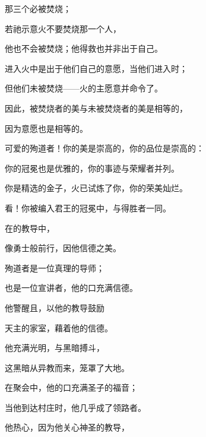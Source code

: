 那三个必被焚烧；\par

若祂示意火不要焚烧那一个人，\par

他也不会被焚烧；他得救也并非出于自己。\par

进入火中是出于他们自己的意愿，当他们进入时；\par

但他们未被焚烧——火的主愿意并命令了。\par

因此，被焚烧者的美与未被焚烧者的美是相等的，\par

因为意愿也是相等的。\par

可爱的殉道者！你的美是崇高的，你的品位是崇高的：\par

你的冠冕也是优雅的，你的事迹与荣耀者并列。\par

你是精选的金子，火已试炼了你，你的荣美灿烂。\par

看！你被编入君王的冠冕中，与得胜者一同。\par

在的教导中，\par

像勇士般前行，因他信德之美。\par

殉道者是一位真理的导师；\par

也是一位宣讲者，他的口充满信德。\par

他警醒且，以他的教导鼓励\par

天主的家室，藉着他的信德。\par

他充满光明，与黑暗搏斗，\par

这黑暗从异教而来，笼罩了大地。\par

在聚会中，他的口充满圣子的福音；\par

当他到达村庄时，他几乎成了领路者。\par

他热心，因为他关心神圣的教导，\par

